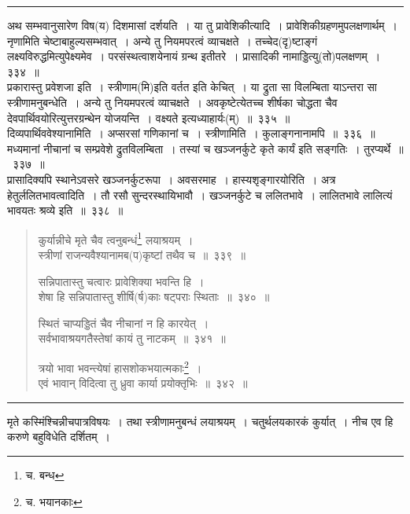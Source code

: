 \documentclass[11pt, openany]{book}
\begin{document}
\hrule

\vspace{2mm}
अथ सम्भवानुसारेण विष(य) दिशमासां दर्शयति~। {\qtt या तु प्रावेशिकीत्यादि}~। प्रावेशिकीग्रहणमुपलक्षणार्थम्~। नृणामिति चेष्टाबाहुल्यसम्भवात्~। {\qtt अन्ये} तु नियमपरत्वं व्याचक्षते~। तच्चेद(दृ)ष्टाङ्गं लक्ष्यविरुद्धमित्युपेक्ष्यमेव~। परसंस्थत्वाशयेनायं ग्रन्थ इतीतरे~। {\qtt प्रासादिकी नामाड्डित्यु}(तो)पलक्षणम्~।३३४~॥\\

{\qtt प्रकारास्तु प्रवेशजा} इति~। स्त्रीणाम(मि)इति वर्तत इति {\qtt केचित्~। या द्रुता} सा विलम्बिता याऽन्तरा सा स्त्रीणामनुबन्धेति~। अन्ये तु नियमपरत्वं व्याचक्षते~। अवकृष्टेत्येतच्च शीर्षका चोद्धता चैव देवपार्थिवयोरित्युत्तरग्रन्थेन योजयन्ति~। वक्ष्यते इत्यध्याहार्यः(म्)~॥~३३५~॥\\

{\qtt दिव्यपार्थिववेश्यानामिति}~। अप्सरसां गणिकानां च~। स्त्रीणामिति~। कुलाङ्गनानामपि~॥~३३६~॥\\

{\qtt मध्यमानां नीचानां च सम्प्रवेशे द्रुतविलम्बिता}~। तस्यां च खञ्जनर्कुटे कृते कार्यं इति सङ्गतिः~। तुरप्यर्थे~॥~३३७~॥\\

{\qtt प्रासादिक्यपि स्थानेऽवसरे} खञ्जनर्कुटरूपा~। {\qtt अवसरमाह}~। हास्यशृङ्गारयोरिति~। अत्र हेतुर्ललितभावत्वादिति~। तौ रसौ सुन्दरस्थायिभावौ~। खञ्जनर्कुटे च ललितभावे~। लालितभावे लालित्यं भावयतः श्रव्ये इति~॥~३३८~॥

\newpage

\begin{quote}
{\na कुर्यान्नीचे मृते चैव त्वनुबन्धं\renewcommand{\thefootnote}{1}\footnote{च. बन्ध} लयाश्रयम्~। \\
 स्त्रीणां राजन्यवैश्यानामब(प)कृष्टां तथैव च~॥~३३९~॥

 सन्निपातास्तु चत्वारः प्रावेशिक्या भवन्ति हि~।\\
 शेषा हि सन्निपातास्तु शीर्षि(र्ष)काः षट्पराः स्थिताः~॥~३४०~॥

 स्थितं चाप्यड्डितं चैव नीचानां न हि कारयेत्~।\\
 सर्वभावाश्रयगतैस्तेषां कायं तु नाटकम्~॥~३४१~॥ 

 त्रयो भावा भवन्त्येषां हासशोकभयात्मकाः\renewcommand{\thefootnote}{2}\footnote{च. भयानकाः}~।\\
 एवं भावान् विदित्वा तु ध्रुवा कार्या प्रयोक्तृभिः~॥~३४२~॥}
\end{quote}

\hrule

\vspace{2mm}
{\qtt मृते} कस्मिंश्चिन्नीचपात्रविषयः~। तथा स्त्रीणामनुबन्धं लयाश्रयम्~। चतुर्थलयकारकं कुर्यात्~। नीच एव हि करुणे बहुविधेति दर्शितम्~। 
\end{document}
